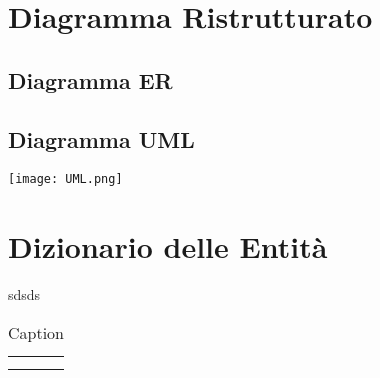 \documentclass[a4paper,12pt,oneside]{book}
\begin{document}
    \section{Diagramma Ristrutturato}
    \subsection{Diagramma ER}
    
    \subsection{Diagramma UML}
    \texttt{[image: UML.png]}
    
    \section{Dizionario delle Entità}
    sdsds
    \begin{table}[]
        \centering
        \begin{tabular}{c|c}
             &  \\
             & 
        \end{tabular}
        \caption{Caption}
        \label{tab:my_label}
    \end{table}
\end{document}
